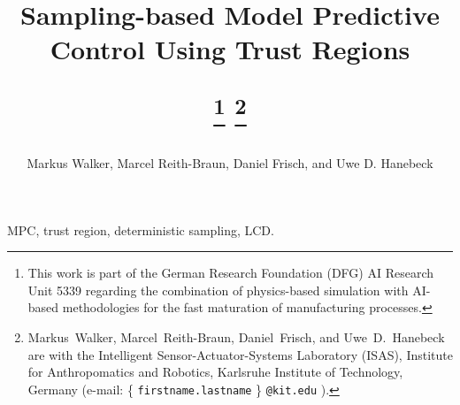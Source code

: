 \documentclass[letterpaper, 10 pt, conference]{ieeeconf}
\title{%
    \LARGE\bf%
    Sampling-based Model Predictive Control Using Trust Regions
%
\author{Markus Walker, Marcel Reith-Braun, Daniel Frisch, and Uwe D. Hanebeck}
\thanks{%
    This work is part of the German Research Foundation (DFG) AI Research Unit 5339 regarding the combination of physics-based simulation with AI-based methodologies for the fast maturation of manufacturing processes.}%
\thanks{%
    Markus~Walker, Marcel~Reith-Braun, Daniel~Frisch, and Uwe~D.~Hanebeck are with the Intelligent Sensor-Actuator-Systems Laboratory (ISAS), Institute for Anthropomatics and Robotics, Karlsruhe Institute of Technology, Germany (e-mail:
    \{%
        {\tt\footnotesize firstname.lastname}%
    \}%
    {\tt\footnotesize @kit.edu}%
    ).%
    }%
}
\begin{document}
\maketitle
\thispagestyle{empty}
\pagestyle{empty}




\begin{keywords}
    \Acl*{MPC}, trust region, deterministic sampling, \acl*{LCD}.
\end{keywords}








% 
% 
% 





% 

\balance


% 





% 
% 
%

% 




\end{document}
